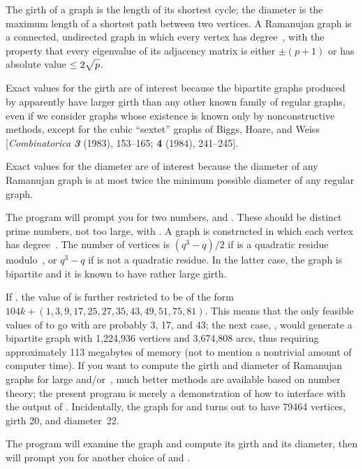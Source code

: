 The girth of a graph is the length of its shortest cycle; the diameter
is the maximum length of a shortest path between two vertices.
A Ramanujan graph is a connected, undirected graph in which every vertex
has degree~, with the property that every eigenvalue of its
adjacency
matrix is either $\pm(p+1)$ or has absolute value $\le2\sqrt{\mathstrut p}$.

Exact values for the girth are of interest because the bipartite graphs
produced by  apparently have larger girth than any other known
family of regular graphs, even if we consider graphs whose existence
is known only by nonconstructive methods, except for the cubic ``sextet''
graphs of Biggs, Hoare, and Weiss [{\sl Combinatorica\/ \bf3} (1983),
153--165; {\bf4} (1984), 241--245].

Exact values for the diameter are of interest because the diameter of
any Ramanujan graph is at most twice the minimum possible diameter
of any regular graph.

The program will prompt you for two numbers,  and . These
should
be distinct prime numbers, not too large, with .  A graph is
constructed in which each vertex has degree~. The number of
vertices is $(q^3-q)/2$ if  is a quadratic residue modulo~, or
$q^3-q$ if  is not a quadratic residue. In the latter case, the
graph is bipartite and it is known to have rather large girth.

If , the value of  is further restricted to be of the
form
$104k+(1,3,9,17,25,27,35,43,49,\allowbreak51,75,81)$. This means that the only
feasible values of  to go with  are probably 3, 17,
and 43;
the next case, , would generate a bipartite graph with
1,224,936 vertices and 3,674,808 arcs, thus requiring approximately
113 megabytes of memory (not to mention a nontrivial amount of
computer time). If you want to compute the girth and diameter
of Ramanujan graphs for large  and/or~, much better methods are
available based on number theory; the present program is merely a
demonstration of how to interface with the output of .
Incidentally, the graph for  and  turns
out to have 79464 vertices, girth 20, and diameter~22.

The program will examine the graph and compute its girth and its diameter,
then will prompt you for another choice of  and .

